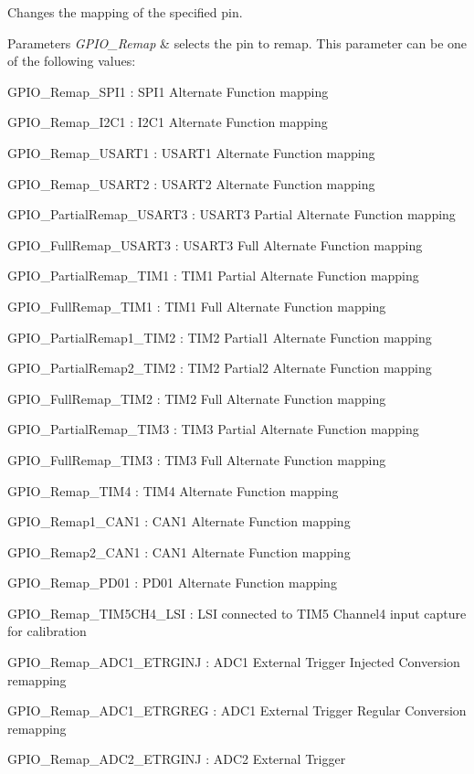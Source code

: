Changes the mapping of the specified pin. 


\begin{DoxyParams}{Parameters}
{\em G\+P\+I\+O\+\_\+\+Remap} & selects the pin to remap. This parameter can be one of the following values\+: \begin{DoxyItemize}
\item G\+P\+I\+O\+\_\+\+Remap\+\_\+\+S\+P\+I1 \+: S\+P\+I1 Alternate Function mapping \item G\+P\+I\+O\+\_\+\+Remap\+\_\+\+I2\+C1 \+: I2\+C1 Alternate Function mapping \item G\+P\+I\+O\+\_\+\+Remap\+\_\+\+U\+S\+A\+R\+T1 \+: U\+S\+A\+R\+T1 Alternate Function mapping \item G\+P\+I\+O\+\_\+\+Remap\+\_\+\+U\+S\+A\+R\+T2 \+: U\+S\+A\+R\+T2 Alternate Function mapping \item G\+P\+I\+O\+\_\+\+Partial\+Remap\+\_\+\+U\+S\+A\+R\+T3 \+: U\+S\+A\+R\+T3 Partial Alternate Function mapping \item G\+P\+I\+O\+\_\+\+Full\+Remap\+\_\+\+U\+S\+A\+R\+T3 \+: U\+S\+A\+R\+T3 Full Alternate Function mapping \item G\+P\+I\+O\+\_\+\+Partial\+Remap\+\_\+\+T\+I\+M1 \+: T\+I\+M1 Partial Alternate Function mapping \item G\+P\+I\+O\+\_\+\+Full\+Remap\+\_\+\+T\+I\+M1 \+: T\+I\+M1 Full Alternate Function mapping \item G\+P\+I\+O\+\_\+\+Partial\+Remap1\+\_\+\+T\+I\+M2 \+: T\+I\+M2 Partial1 Alternate Function mapping \item G\+P\+I\+O\+\_\+\+Partial\+Remap2\+\_\+\+T\+I\+M2 \+: T\+I\+M2 Partial2 Alternate Function mapping \item G\+P\+I\+O\+\_\+\+Full\+Remap\+\_\+\+T\+I\+M2 \+: T\+I\+M2 Full Alternate Function mapping \item G\+P\+I\+O\+\_\+\+Partial\+Remap\+\_\+\+T\+I\+M3 \+: T\+I\+M3 Partial Alternate Function mapping \item G\+P\+I\+O\+\_\+\+Full\+Remap\+\_\+\+T\+I\+M3 \+: T\+I\+M3 Full Alternate Function mapping \item G\+P\+I\+O\+\_\+\+Remap\+\_\+\+T\+I\+M4 \+: T\+I\+M4 Alternate Function mapping \item G\+P\+I\+O\+\_\+\+Remap1\+\_\+\+C\+A\+N1 \+: C\+A\+N1 Alternate Function mapping \item G\+P\+I\+O\+\_\+\+Remap2\+\_\+\+C\+A\+N1 \+: C\+A\+N1 Alternate Function mapping \item G\+P\+I\+O\+\_\+\+Remap\+\_\+\+P\+D01 \+: P\+D01 Alternate Function mapping \item G\+P\+I\+O\+\_\+\+Remap\+\_\+\+T\+I\+M5\+C\+H4\+\_\+\+L\+SI \+: L\+SI connected to T\+I\+M5 Channel4 input capture for calibration \item G\+P\+I\+O\+\_\+\+Remap\+\_\+\+A\+D\+C1\+\_\+\+E\+T\+R\+G\+I\+NJ \+: A\+D\+C1 External Trigger Injected Conversion remapping \item G\+P\+I\+O\+\_\+\+Remap\+\_\+\+A\+D\+C1\+\_\+\+E\+T\+R\+G\+R\+EG \+: A\+D\+C1 External Trigger Regular Conversion remapping \item G\+P\+I\+O\+\_\+\+Remap\+\_\+\+A\+D\+C2\+\_\+\+E\+T\+R\+G\+I\+NJ \+: A\+D\+C2 External Trigger 
\end{DoxyItemize}
\end{DoxyParams}
